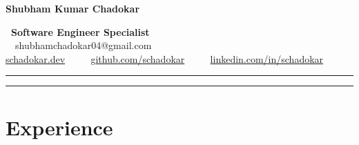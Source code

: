 \documentclass[11pt,a4paper,hidelinks]{article}
\begin{document}
\begin{center}
  {\Huge \textbf{Shubham Kumar Chadokar}}

  \textbf{\Large\ \textbf{Software Engineer Specialist}} \\

  \ \ shubhamchadokar04@gmail.com
  \\

  {{\href {https://schadokar.dev}{{schadokar.dev}}}} \ \ \textbullet
 \ \  {{\href{https://github.com/schadokar}{{github.com/schadokar}}}} \ \ \textbullet
  \ \ {{\href {https://www.linkedin.com/in/schadokar/}{{linkedin.com/in/schadokar}}}}

\end{center}

\hrule
\vspace{-0.4em}

\vspace{0.4em}


{\color{IFLightBlue} \hrule}
\vspace{-0.4em}
{\color{IFMediumBlue}\section*{Experience}}
\end{document}

